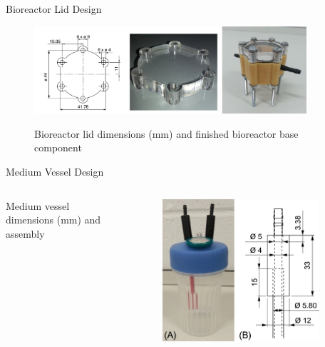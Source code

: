 \documentclass[11pt,t]{beamer}
\begin{document}
\begin{frame}[fragile]{Bioreactor Lid Design}  

			\begin{figure}
			\centering
			\includegraphics[width=0.9\textwidth]{design_lid}
			
			\vspace{15pt}
			\footnotesize Bioreactor lid dimensions (mm) and finished bioreactor base component
			\end{figure}

\end{frame}

\begin{frame}[fragile]{Medium Vessel Design}  

		\begin{columns}[t]
		\begin{column}{.50\textwidth}
					\vspace{50pt}
			\footnotesize Medium vessel dimensions (mm) and assembly 
 
		\end{column}
		\begin{column}{.50\textwidth}
			\vspace{-20pt}
			\begin{figure}
			\centering
			\includegraphics[width=0.9\textwidth]{design_medium}
			
			\end{figure}
		\end{column}
	\end{columns}

\end{frame}
\end{document}
